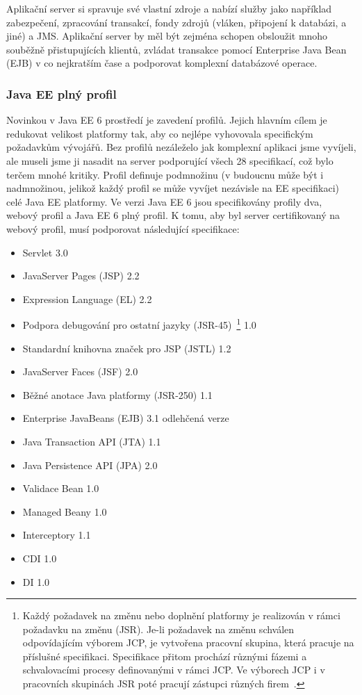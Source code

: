 \documentclass[122pt,oneside]{fithesis}
\begin{document}
Aplikační server si spravuje své vlastní zdroje a nabízí služby jako například zabezpečení, zpracování transakcí, fondy zdrojů (vláken, připojení k databázi, a jiné) a JMS. Aplikační server by měl být zejména schopen obsloužit mnoho souběžně přistupujících klientů, zvládat transakce pomocí Enterprise Java Bean (EJB) v co nejkratším čase a podporovat komplexní databázové operace.


\subsubsection{Java EE plný profil}
\label{profily}
Novinkou v Java EE 6 prostředí je zavedení profilů. Jejich hlavním cílem je redukovat velikost platformy tak, aby co nejlépe vyhovovala specifickým požadavkům vývojářů. Bez profilů nezáleželo jak komplexní aplikaci jsme vyvíjeli, ale museli jsme ji nasadit na server podporující všech 28 specifikací, což bylo terčem mnohé kritiky. Profil definuje podmnožinu (v budoucnu může být i nadmnožinou, jelikož každý profil se může vyvíjet nezávisle na EE specifikaci) celé Java EE platformy. Ve verzi Java EE 6 jsou specifikovány profily dva, webový profil a Java EE 6 plný profil. K tomu, aby byl server certifikovaný na webový profil, musí podporovat následující specifikace:
\begin{itemize}
  \item Servlet 3.0
  \item JavaServer Pages (JSP) 2.2
  \item Expression Language (EL) 2.2
  \item Podpora debugování pro ostatní jazyky (JSR-45)~\footnote{Každý požadavek na změnu nebo doplnění platformy je realizován v rámci požadavku na změnu (JSR). Je-li požadavek na změnu schválen odpovídajícím výborem JCP, je vytvořena pracovní skupina, která pracuje na příslušné specifikaci. Specifikace přitom prochází různými fázemi a schvalovacími procesy definovanými v rámci JCP. Ve výborech JCP i v pracovních skupinách JSR poté pracují zástupci různých firem~\cite{wikiJSR}.} 1.0
  \item Standardní knihovna značek pro JSP (JSTL) 1.2
  \item JavaServer Faces (JSF) 2.0
  \item Běžné anotace Java platformy (JSR-250) 1.1
  \item Enterprise JavaBeans (EJB) 3.1 odlehčená verze
  \item Java Transaction API (JTA) 1.1
  \item Java Persistence API (JPA) 2.0
  \item Validace Bean 1.0
  \item Managed Beany 1.0
  \item Interceptory 1.1
  \item CDI 1.0
  \item DI 1.0
\end{itemize}
\end{document}
